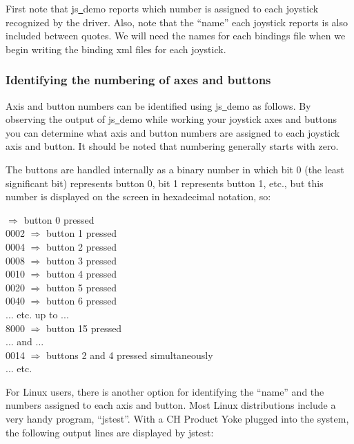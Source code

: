 \noindent
First note that js\underline{~}demo reports which number is assigned to each joystick recognized by the driver.  Also, note that the ``name'' each joystick reports is also included between quotes.  We will need the names for each bindings file when we begin writing the binding xml files for each joystick.

\subsubsection{Identifying the numbering of axes and buttons\label{identifying}}
Axis and button numbers can be identified using js\underline{~}demo as follows. By observing the output of js\underline{~}demo while working your joystick axes and buttons you can determine what axis and button numbers are assigned to each joystick axis and button. It should be noted that numbering generally starts with zero.

The buttons are handled internally as a binary number in which bit 0 (the least significant bit) represents button 0, bit 1 represents button 1, etc., but this number is displayed on the screen in hexadecimal notation, so:
\medskip

 $\Rightarrow$ button 0 pressed\\
  0002 $\Rightarrow$ button 1 pressed\\
  0004 $\Rightarrow$ button 2 pressed\\
  0008 $\Rightarrow$ button 3 pressed\\
  0010 $\Rightarrow$ button 4 pressed\\
  0020 $\Rightarrow$ button 5 pressed\\
  0040 $\Rightarrow$ button 6 pressed\\
  ... etc. up to ...\\
  8000 $\Rightarrow$ button 15 pressed\\
  ... and ...\\
  0014 $\Rightarrow$ buttons 2 and 4 pressed simultaneously\\
  ... etc.
  \medskip

For Linux users, there is another option for identifying the ``name'' and the numbers assigned to each axis and button.  Most Linux distributions include a very handy program, ``jstest''.  With a CH Product Yoke plugged into the system, the following output lines are displayed by jstest:
\medskip

